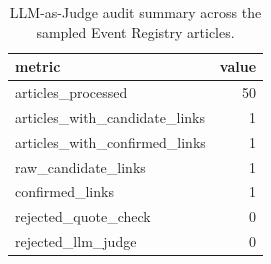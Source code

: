 \begin{table}
\caption{LLM-as-Judge audit summary across the sampled Event Registry articles.}
\label{tab:llm_as_judge_audit_summary}
\begin{tabular}{lr}
\toprule
metric & value \\
\midrule
articles_processed & 50 \\
articles_with_candidate_links & 1 \\
articles_with_confirmed_links & 1 \\
raw_candidate_links & 1 \\
confirmed_links & 1 \\
rejected_quote_check & 0 \\
rejected_llm_judge & 0 \\
\bottomrule
\end{tabular}
\end{table}
